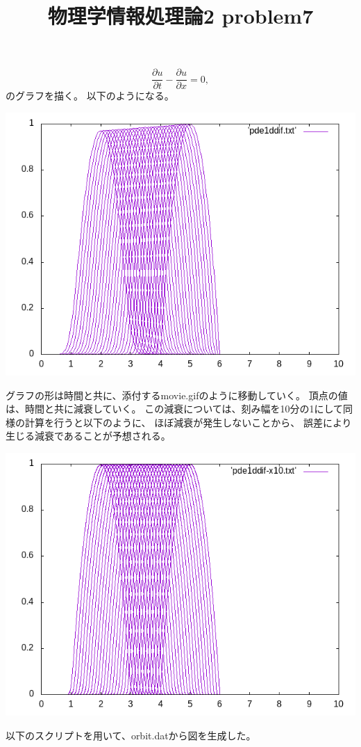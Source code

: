 \documentclass[12pt,a5]{bxjsarticle}
\title{物理学情報処理論2 problem7}
\date{}
\begin{document}
\maketitle

\section{}

\[
  \frac{\partial u}{\partial t} - \frac{\partial u}{\partial x} = 0,
\]
のグラフを描く。
以下のようになる。

\includegraphics[width=\linewidth]{graph.png}

グラフの形は時間と共に、添付するmovie.gifのように移動していく。
頂点の値は、時間と共に減衰していく。
この減衰については、刻み幅を10分の1にして同様の計算を行うと以下のように、
ほぼ減衰が発生しないことから、
誤差により生じる減衰であることが予想される。

\includegraphics[width=\linewidth]{graph-x10.png}

以下のスクリプトを用いて、orbit.datから図を生成した。

\end{document}
